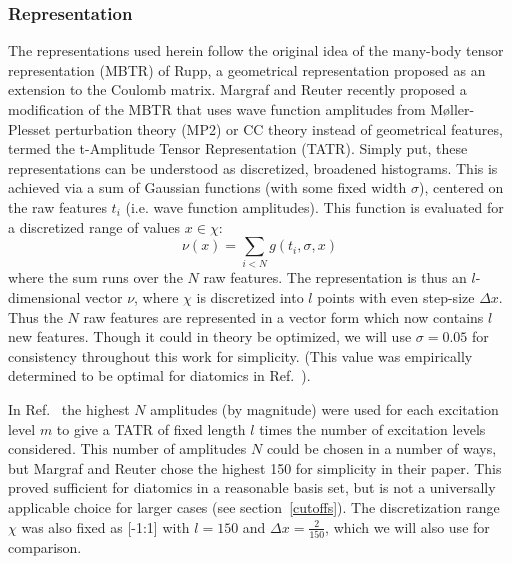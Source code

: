\subsubsection{Representation} \label{rep}
The representations used herein follow the original idea of the many-body tensor representation (MBTR) of Rupp\cite{Rupp2018}, a geometrical representation proposed as an extension to the Coulomb matrix\cite{Rupp2012}. Margraf and Reuter recently proposed a modification of the MBTR that uses wave function amplitudes from M{\o}ller-Plesset perturbation theory (MP2) or CC theory instead of geometrical features, termed the t-Amplitude Tensor Representation (TATR)\cite{Margraf2018}. 
Simply put, these representations can be understood as discretized, broadened histograms. This is achieved via a sum of Gaussian functions (with some fixed width $\sigma$), centered on the raw features $t_i$ (i.e. wave function amplitudes). This function is evaluated for a discretized range of values $x \in \chi$: 
\begin{equation} \label{eq:mbtr}
    \nu(x) = \sum_{i<N}g(t_i,\sigma,x)
\end{equation}
where the sum runs over the $N$ raw features. The representation is thus an $l$-dimensional vector $\nu$, where $\chi$ is discretized into $l$ points with even step-size $\Delta x$. Thus the $N$ raw features are represented in a vector form which now contains $l$ new features. Though it could in theory be optimized, we will use $\sigma = 0.05$ for consistency throughout this work for simplicity. (This value was empirically determined to be optimal for diatomics in Ref.~). 

In Ref.~ the highest $N$ amplitudes (by magnitude) were used for each excitation level $m$ to give a TATR of fixed length $l$ times the number of excitation levels considered.
This number of amplitudes $N$ could be chosen in a number of ways, but Margraf and Reuter chose the highest 150 for simplicity in their paper. This proved sufficient for diatomics in a reasonable basis set, but is not a universally applicable choice for larger cases (see section~\ref{cutoffs}). The discretization range $\chi$ was also fixed as [-1:1] with $l = 150$ and $\Delta x = \frac{2}{150}$, which we will also use for comparison.


